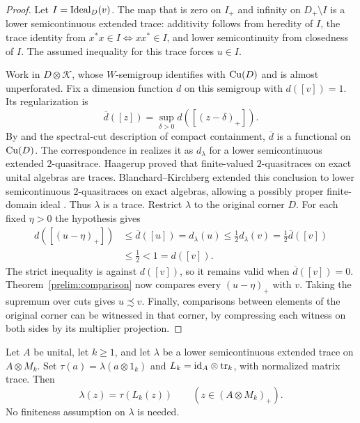 \begin{proof}
Let $I=\operatorname{Ideal}_D(v)$.  The map that is zero on $I_+$ and infinity on
$D_+\setminus I$ is a lower semicontinuous extended trace: additivity
follows from heredity of $I$, the trace identity from
$x^*x\in I\Longleftrightarrow xx^*\in I$, and lower semicontinuity
from closedness of $I$.  The assumed inequality for this trace forces
$u\in I$.

Work in $D\otimes\mathcal K$, whose $W$-semigroup identifies with
$\mathrm{Cu}(D)$ and is almost unperforated.  Fix a dimension function $d$ on
this semigroup with $d([v])=1$.  Its regularization is
\[
 \overline d([z])=\sup_{\delta>0}d([(z-\delta)_+]).
\]
By \cite[Lemma~4.7]{ERS} and the spectral-cut description of compact
containment, $\overline d$ is a functional on $\mathrm{Cu}(D)$.  The
correspondence in \cite[Proposition~4.2]{ERS} realizes it as
$d_\lambda$ for a lower semicontinuous extended $2$-quasitrace.
Haagerup proved that finite-valued $2$-quasitraces on exact unital
algebras are traces.  Blanchard--Kirchberg extended this conclusion to
lower semicontinuous $2$-quasitraces on exact algebras, allowing a
possibly proper finite-domain ideal \cite[Remarks~4.3 and~4.5]{ERS}.
Thus $\lambda$ is a trace.  Restrict $\lambda$ to the original corner
$D$.  For each fixed $\eta>0$ the hypothesis gives
\[
 \begin{split}
 d([(u-\eta)_+])
 &\le\overline d([u])=d_\lambda(u)
 \le\tfrac12d_\lambda(v)
 =\tfrac12\overline d([v])\\
 &\le\tfrac12<1=d([v]).
 \end{split}
\]
The strict inequality is against $d([v])$, so it remains valid when
$\overline d([v])=0$.  Theorem~\ref{prelim:comparison} now compares
every $(u-\eta)_+$ with $v$.  Taking the supremum over cuts gives
$u\precsim v$.  Finally, comparisons between elements of the original
corner can be witnessed in that corner, by compressing each witness on
both sides by its multiplier projection.
\end{proof}

\begin{lemma}
\label{prelim:matrix-traces}
Let $A$ be unital, let $k\ge1$, and let $\lambda$ be a lower
semicontinuous extended trace on $A\otimes M_k$.  Set
$\tau(a)=\lambda(a\otimes1_k)$ and
$L_k=\mathrm{id}_A\otimes\operatorname{tr}_k$, with normalized matrix trace.
Then
\[
 \lambda(z)=\tau(L_k(z))\qquad(z\in(A\otimes M_k)_+).
\]
No finiteness assumption on $\lambda$ is needed.
\end{lemma}

